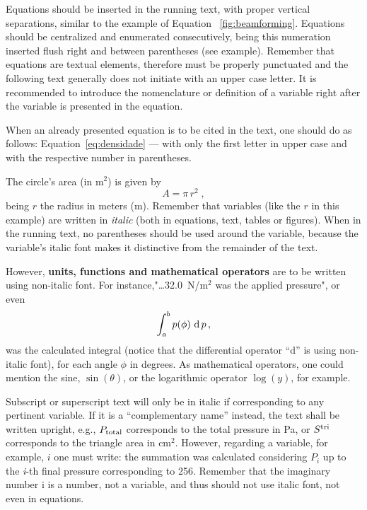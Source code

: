 \documentclass[12pt, a4paper, twoside, twocolumn]{article}
\begin{document}
Equations should be inserted in the running text, with proper vertical separations, similar to the example of Equation ~\eqref{fig:beamforming}. Equations  should be centralized and  enumerated consecutively, being this numeration inserted flush right and between parentheses (see example). Remember that equations  are textual elements, therefore must be properly punctuated and the following text generally does not initiate with an upper case letter. It is recommended to introduce the nomenclature or definition of a variable right after the variable is presented in the equation.

When an already presented equation is to be cited in the text, one should do as follows: Equation~\eqref{eq:densidade} --- with only the first letter in upper case and with the respective number in parentheses.

The circle's area (in m$^2$) is given by
\begin{equation}
	A = \pi \, r^2\;,
\label{eq:area-circ}
\end{equation}
being $r$ the radius in meters (m). 
%
Remember that variables (like the $r$ in this example) are written in \textit{italic} (both in  equations, text, tables or figures). When in the running text, no parentheses should be used around the variable, because the variable's italic font makes it distinctive from the remainder of the text. 

However, \textbf{units, functions and mathematical operators} are to be written using non-italic font. For instance,"\ldots  32.0~N/m$^2$ was the applied pressure", or even
%
\begin{equation}
	\int_a^b p(\phi)\, \operatorname{d} p\,,
\label{eq:int}
\end{equation}
was the calculated integral (notice that the differential operator ``d'' is using non-italic font), for each angle $\phi$ in degrees. As mathematical operators, one could mention the sine, $\sin(\theta)$, or the logarithmic operator $\log(y)$, for example.

Subscript or superscript text will only be in italic if corresponding to any pertinent variable. If it is a ``complementary name'' instead, the text shall be written upright, e.g., $P_{\text{total}}$ corresponds to the total pressure in Pa, or $S^{\text{tri}}$ corresponds to the triangle area in cm$^2$. However, regarding a variable, for example, $i$ one must write: the summation was calculated considering $P_i$ up to the \textit{i}-th final pressure corresponding to 256. Remember that the imaginary number i is a number, not a variable, and thus should not use italic font, not even in equations.
\end{document}
